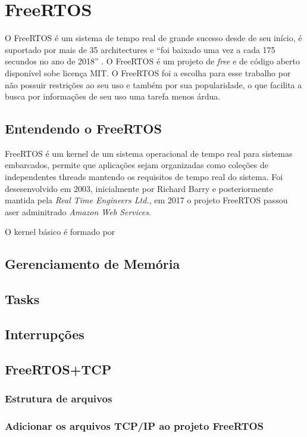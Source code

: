 \chapter{FreeRTOS}


O FreeRTOS é um sistema de tempo real de grande sucesso desde de seu início,
é suportado por mais de 35 architectures e ``foi baixado uma vez a cada 175
secundos no ano de 2018'' \cite{FreeRTOS_history}. O FreeRTOS é um projeto de
\textit{free} e de código aberto disponível sobe licença MIT. O FreeRTOS foi
a escolha para esse trabalho por não possuir restrições ao seu uso e também
por sua popularidade, o que facilita a busca por informações de seu uso uma
tarefa menos árdua.

\section{Entendendo o FreeRTOS}

FreeRTOS é um kernel de um sistema operacional de tempo real para sistemas
embarcados, permite que aplicações sejam organizadas como coleções de 
independentes threads mantendo os requisitos de tempo real do sistema.
Foi desesenvolvido em 2003, inicialmente por Richard Barry e posteriormente
mantida pela \textit{Real Time Engineers Ltd.}, em 2017 o projeto 
FreeRTOS passou aser adminitrado \textit{Amazon Web Services}.

O kernel básico é formado por 

 

\section{Gerenciamento de Memória}

\section{Tasks}

\section{Interrupções}




\section{FreeRTOS+TCP}

\subsection{Estrutura de arquivos}


\subsection{Adicionar os arquivos TCP/IP ao projeto FreeRTOS}

